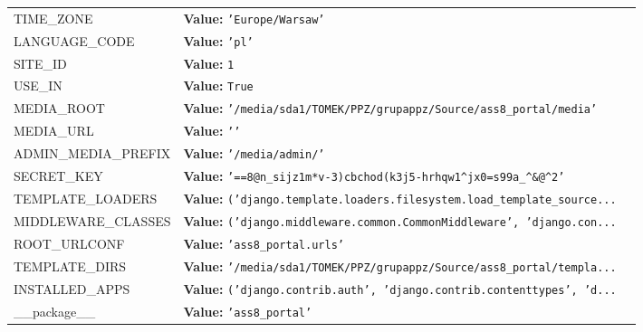 \begin{longtable}{|p{\varnamewidth}|p{\vardescrwidth}|l}
\cline{1-2}
\raggedright T\-I\-M\-E\-\_\-Z\-O\-N\-E\- & \raggedright \textbf{Value:} 
{\tt \texttt{'}\texttt{Europe/Warsaw}\texttt{'}}&\\
\cline{1-2}
\raggedright L\-A\-N\-G\-U\-A\-G\-E\-\_\-C\-O\-D\-E\- & \raggedright \textbf{Value:} 
{\tt \texttt{'}\texttt{pl}\texttt{'}}&\\
\cline{1-2}
\raggedright S\-I\-T\-E\-\_\-I\-D\- & \raggedright \textbf{Value:} 
{\tt 1}&\\
\cline{1-2}
\raggedright U\-S\-E\-\_\-I\-1\-8\-N\- & \raggedright \textbf{Value:} 
{\tt True}&\\
\cline{1-2}
\raggedright M\-E\-D\-I\-A\-\_\-R\-O\-O\-T\- & \raggedright \textbf{Value:} 
{\tt \texttt{'}\texttt{/media/sda1/TOMEK/PPZ/grupappz/Source/ass8\_portal/media}\texttt{'}}&\\
\cline{1-2}
\raggedright M\-E\-D\-I\-A\-\_\-U\-R\-L\- & \raggedright \textbf{Value:} 
{\tt \texttt{'}\texttt{}\texttt{'}}&\\
\cline{1-2}
\raggedright A\-D\-M\-I\-N\-\_\-M\-E\-D\-I\-A\-\_\-P\-R\-E\-F\-I\-X\- & \raggedright \textbf{Value:} 
{\tt \texttt{'}\texttt{/media/admin/}\texttt{'}}&\\
\cline{1-2}
\raggedright S\-E\-C\-R\-E\-T\-\_\-K\-E\-Y\- & \raggedright \textbf{Value:} 
{\tt \texttt{'}\texttt{==8@n\_sijz1m*v-3)cbchod(k3j5-hrhqw1{\textasciicircum}jx0=s99a\_{\textasciicircum}\&@{\textasciicircum}2}\texttt{'}}&\\
\cline{1-2}
\raggedright T\-E\-M\-P\-L\-A\-T\-E\-\_\-L\-O\-A\-D\-E\-R\-S\- & \raggedright \textbf{Value:} 
{\tt \texttt{(}\texttt{'}\texttt{django.template.loaders.filesystem.load\_template\_source}\texttt{...}}&\\
\cline{1-2}
\raggedright M\-I\-D\-D\-L\-E\-W\-A\-R\-E\-\_\-C\-L\-A\-S\-S\-E\-S\- & \raggedright \textbf{Value:} 
{\tt \texttt{(}\texttt{'}\texttt{django.middleware.common.CommonMiddleware}\texttt{'}\texttt{, }\texttt{'}\texttt{django.con}\texttt{...}}&\\
\cline{1-2}
\raggedright R\-O\-O\-T\-\_\-U\-R\-L\-C\-O\-N\-F\- & \raggedright \textbf{Value:} 
{\tt \texttt{'}\texttt{ass8\_portal.urls}\texttt{'}}&\\
\cline{1-2}
\raggedright T\-E\-M\-P\-L\-A\-T\-E\-\_\-D\-I\-R\-S\- & \raggedright \textbf{Value:} 
{\tt \texttt{'}\texttt{/media/sda1/TOMEK/PPZ/grupappz/Source/ass8\_portal/templa}\texttt{...}}&\\
\cline{1-2}
\raggedright I\-N\-S\-T\-A\-L\-L\-E\-D\-\_\-A\-P\-P\-S\- & \raggedright \textbf{Value:} 
{\tt \texttt{(}\texttt{'}\texttt{django.contrib.auth}\texttt{'}\texttt{, }\texttt{'}\texttt{django.contrib.contenttypes}\texttt{'}\texttt{, }\texttt{'}\texttt{d}\texttt{...}}&\\
\cline{1-2}
\raggedright \_\-\_\-p\-a\-c\-k\-a\-g\-e\-\_\-\_\- & \raggedright \textbf{Value:} 
{\tt \texttt{'}\texttt{ass8\_portal}\texttt{'}}&\\
\cline{1-2}
\end{longtable}

